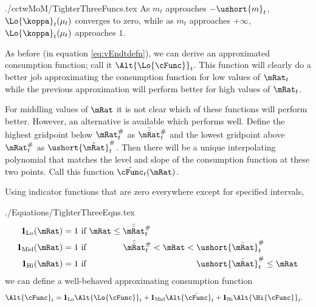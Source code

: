 \documentclass[titlepage]{\econtex}
\begin{document}
\begin{verbatimwrite}{./cctwMoM/TighterThreeFuncs.tex}
  As $m_{t}$ approaches
  $-\ushort{m}_{t}$, $\Lo{\koppa}_{t}(\mu_{t})$ converges to zero, while as $m_{t}$
  approaches $+\infty$, $\Lo{\koppa}_{t}(\mu_{t})$ approaches $1$.  

  As before (in equation \eqref{eq:vEndtdefn}), we can derive an approximated consumption function; call it
  $\Alt{\Lo{\cFunc}}_{t}$.  This function will clearly do a better job approximating the consumption
  function for low values of $\mRat_{t}$ while the previous approximation will perform better
  for high values of $\mRat_{t}$.  

  For middling values of $\mRat$ it is not clear which of these
  functions will perform better.  However, an alternative is available
  which performs well.  Define the highest gridpoint below $\mtCusp$ as
  $\bar{\check{\mRat}}_{t}^{\#}$ and the lowest gridpoint above $\mtCusp$ as
  $\ushort{\hat{\mRat}}_{t}^{\#}$.  Then there will be a unique interpolating
  polynomial that matches the level and slope of the consumption function
  at these two points.  Call this function $\tilde{\cFunc}_{t}(\mRat)$.  

  Using indicator functions that are zero everywhere except for specified intervals,
\end{verbatimwrite}

\begin{verbatimwrite}{./Equations/TighterThreeEqns.tex}
  \begin{equation*}\begin{gathered}\begin{aligned}
    \pmb{1}_{\text{Lo}}(\mRat)  & = 1 \text{~if $          \mRat \leq  \bar{\check{\mRat}}_{t}^{\#} \phantom{< \mRat <   \ushort{\hat{\mRat}}_{t}^{\#}          \leq \mRat}$}
    \\  \pmb{1}_{\text{Mid}}(\mRat)  & = 1 \text{~if $\phantom{ \mRat \leq}~ \bar{\check{\mRat}}_{t}^{\#}          < \mRat <   \ushort{\hat{\mRat}}_{t}^{\#} \phantom{\leq \mRat}$}
    \\  \pmb{1}_{\text{Hi}}(\mRat)  & = 1 \text{~if $\phantom{ \mRat \leq  ~\bar{\check{\mRat}}_{t}^{\#}          < \mRat < } \ushort{\hat{\mRat}}_{t}^{\#}           \leq \mRat$}
  \end{aligned}\end{gathered}\end{equation*}
  we can define a well-behaved approximating consumption function
  \begin{equation}\begin{gathered}\begin{aligned}
    \Alt{\cFunc}_{t}  & = \pmb{1}_{\text{Lo}} \Alt{\Lo{\cFunc}}_{t} + \pmb{1}_{\text{Mid}} \Alt{\tilde{\cFunc}}_{t}+\pmb{1}_{\text{Hi}} \Alt{\Hi{\cFunc}}_{t}.
  \end{aligned}\end{gathered}\end{equation}
\end{verbatimwrite}

\end{document}
